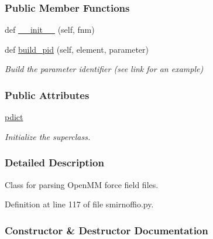 \subsubsection*{Public Member Functions}
\begin{DoxyCompactItemize}
\item 
def \hyperlink{classsrc_1_1smirnoffio_1_1SMIRNOFF__Reader_a9dfdb193dd394620c9af8798f17c4a45}{\+\_\+\+\_\+init\+\_\+\+\_\+} (self, fnm)
\item 
def \hyperlink{classsrc_1_1smirnoffio_1_1SMIRNOFF__Reader_ab3ceaf1974b7b1839ddaaa0cc3fc24b8}{build\+\_\+pid} (self, element, parameter)
\begin{DoxyCompactList}\small\item\em Build the parameter identifier (see {\itshape link} for an example) \end{DoxyCompactList}\end{DoxyCompactItemize}
\subsubsection*{Public Attributes}
\begin{DoxyCompactItemize}
\item 
\hyperlink{classsrc_1_1smirnoffio_1_1SMIRNOFF__Reader_a215b10b0652a0bf3dc1b142f7893a9ec}{pdict}
\begin{DoxyCompactList}\small\item\em Initialize the superclass. \end{DoxyCompactList}\end{DoxyCompactItemize}


\subsubsection{Detailed Description}
Class for parsing Open\+MM force field files. 



Definition at line 117 of file smirnoffio.\+py.



\subsubsection{Constructor \& Destructor Documentation}
\mbox{\label{classsrc_1_1smirnoffio_1_1SMIRNOFF__Reader_a9dfdb193dd394620c9af8798f17c4a45}} 
